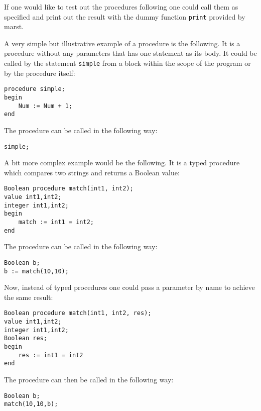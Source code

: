 \documentclass{article}
\begin{document}
If one would like to test out the procedures following one could call them as specified and print out the result with the dummy function \texttt{print} provided by marst.

A very simple but illustrative example of a procedure is the following. It is a procedure without any parameters that has one statement as its body. It could be called by the statement \texttt{simple} from a block within the scope of the program or by the procedure itself:\\

\begin{lstlisting}[language={[60]algol}]
procedure simple;
begin
    Num := Num + 1;
end
\end{lstlisting}

The procedure can be called in the following way:

\begin{lstlisting}[language={[60]algol}]
simple;
\end{lstlisting}

A bit more complex example would be the following. It is a typed procedure which compares two strings and returns a Boolean value:\\

\begin{lstlisting}[language={[60]algol}]
Boolean procedure match(int1, int2);
value int1,int2;
integer int1,int2;
begin
    match := int1 = int2;
end
\end{lstlisting}

The procedure can be called in the following way:

\begin{lstlisting}[language={[60]algol}]
Boolean b;
b := match(10,10);
\end{lstlisting}

Now, instead of typed procedures one could pass a parameter by name to achieve the same result:

\begin{lstlisting}[language={[60]algol}]
Boolean procedure match(int1, int2, res);
value int1,int2;
integer int1,int2;
Boolean res;
begin
    res := int1 = int2
end
\end{lstlisting}

The procedure can then be called in the following way:

\begin{lstlisting}[language={[60]algol}]
Boolean b;
match(10,10,b);
\end{lstlisting}
\end{document}
